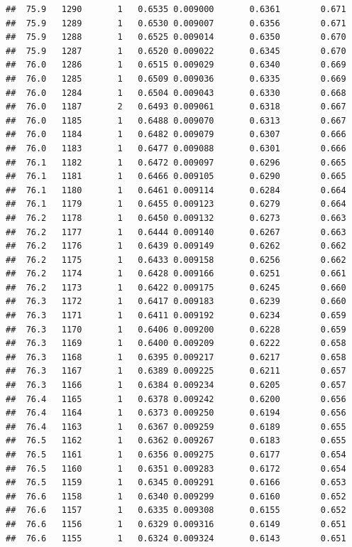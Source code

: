 \documentclass[
]{book}
\begin{document}
\begin{verbatim}
##  75.9   1290       1   0.6535 0.009000       0.6361        0.671
##  75.9   1289       1   0.6530 0.009007       0.6356        0.671
##  75.9   1288       1   0.6525 0.009014       0.6350        0.670
##  75.9   1287       1   0.6520 0.009022       0.6345        0.670
##  76.0   1286       1   0.6515 0.009029       0.6340        0.669
##  76.0   1285       1   0.6509 0.009036       0.6335        0.669
##  76.0   1284       1   0.6504 0.009043       0.6330        0.668
##  76.0   1187       2   0.6493 0.009061       0.6318        0.667
##  76.0   1185       1   0.6488 0.009070       0.6313        0.667
##  76.0   1184       1   0.6482 0.009079       0.6307        0.666
##  76.0   1183       1   0.6477 0.009088       0.6301        0.666
##  76.1   1182       1   0.6472 0.009097       0.6296        0.665
##  76.1   1181       1   0.6466 0.009105       0.6290        0.665
##  76.1   1180       1   0.6461 0.009114       0.6284        0.664
##  76.1   1179       1   0.6455 0.009123       0.6279        0.664
##  76.2   1178       1   0.6450 0.009132       0.6273        0.663
##  76.2   1177       1   0.6444 0.009140       0.6267        0.663
##  76.2   1176       1   0.6439 0.009149       0.6262        0.662
##  76.2   1175       1   0.6433 0.009158       0.6256        0.662
##  76.2   1174       1   0.6428 0.009166       0.6251        0.661
##  76.2   1173       1   0.6422 0.009175       0.6245        0.660
##  76.3   1172       1   0.6417 0.009183       0.6239        0.660
##  76.3   1171       1   0.6411 0.009192       0.6234        0.659
##  76.3   1170       1   0.6406 0.009200       0.6228        0.659
##  76.3   1169       1   0.6400 0.009209       0.6222        0.658
##  76.3   1168       1   0.6395 0.009217       0.6217        0.658
##  76.3   1167       1   0.6389 0.009225       0.6211        0.657
##  76.3   1166       1   0.6384 0.009234       0.6205        0.657
##  76.4   1165       1   0.6378 0.009242       0.6200        0.656
##  76.4   1164       1   0.6373 0.009250       0.6194        0.656
##  76.4   1163       1   0.6367 0.009259       0.6189        0.655
##  76.5   1162       1   0.6362 0.009267       0.6183        0.655
##  76.5   1161       1   0.6356 0.009275       0.6177        0.654
##  76.5   1160       1   0.6351 0.009283       0.6172        0.654
##  76.5   1159       1   0.6345 0.009291       0.6166        0.653
##  76.6   1158       1   0.6340 0.009299       0.6160        0.652
##  76.6   1157       1   0.6335 0.009308       0.6155        0.652
##  76.6   1156       1   0.6329 0.009316       0.6149        0.651
##  76.6   1155       1   0.6324 0.009324       0.6143        0.651

\end{verbatim}
\end{document}
